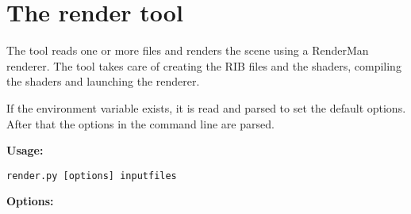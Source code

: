 
\section{The render tool}

The tool  reads one or more files and renders the
scene using a RenderMan renderer. The tool takes care of creating the
RIB files and the shaders, compiling the shaders and launching the 
renderer.

If the environment variable  exists, it
is read and parsed to set the default options. After that the options
in the command line are parsed.

{\bf Usage:}

\begin{verbatim}
render.py [options] inputfiles
\end{verbatim}


{\bf Options:}

